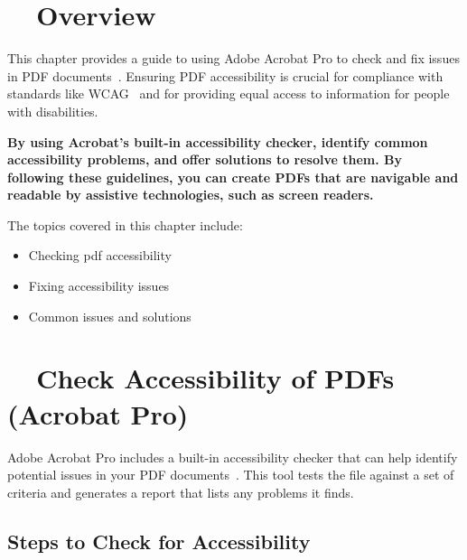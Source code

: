 \label{cha:creating-and-verifying-pdf-accessibility-with-adobe-acrobat}

\section{~~Overview}
\label{sec:overview-16}

This chapter provides a guide to using Adobe Acrobat Pro to check and fix  issues in PDF documents~\supercite{AdobeAccessGuide, AdobeHelpX}. Ensuring PDF accessibility is crucial for compliance with standards like WCAG~\supercite{WCAG21, WCAG22} and for providing equal access to information for people with disabilities.

\textbf{By using Acrobat's built-in accessibility checker, identify common accessibility problems, and offer solutions to resolve them. By following these guidelines, you can create PDFs that are navigable and readable by assistive technologies, such as screen readers.}

The topics covered in this chapter include:

\begin{itemize}
	\item Checking \gls{pdf} \gls{accessibility}
	\item Fixing accessibility issues
	\item Common  issues and solutions
\end{itemize}

\section{~~Check Accessibility of PDFs (Acrobat Pro)}
\label{sec:check-accessibility-of-pdfs-acrobat-pro}

Adobe Acrobat Pro includes a built-in accessibility checker that can help identify potential issues in your PDF documents~\supercite{AdobeAccessGuide}. This tool tests the file against a set of  criteria and generates a report that lists any problems it finds.

\subsection{Steps to Check for Accessibility}\label{sub:steps-to-check-for-accessibility}\supercite{AdobeHelpX}

